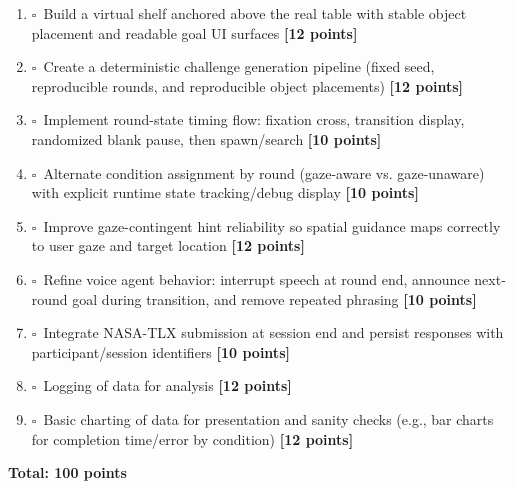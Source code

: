 \documentclass[12pt,letterpaper]{article}
\newcommand{\taskbox}{$\square$}
\begin{document}
\begin{enumerate}[leftmargin=0.8cm, itemsep=0.45cm, label=\textbf{\arabic*.}]
    \item \taskbox\ Build a virtual shelf anchored above the real table with stable object placement and readable goal UI surfaces \hfill {\color{successgreen}\bfseries [12 points]}

    \item \taskbox\ Create a deterministic challenge generation pipeline (fixed seed, reproducible rounds, and reproducible object placements) \hfill {\color{successgreen}\bfseries [12 points]}

    \item \taskbox\ Implement round-state timing flow: fixation cross, transition display, randomized blank pause, then spawn/search \hfill {\color{successgreen}\bfseries [10 points]}

    \item \taskbox\ Alternate condition assignment by round (gaze-aware vs. gaze-unaware) with explicit runtime state tracking/debug display \hfill {\color{successgreen}\bfseries [10 points]}

    \item \taskbox\ Improve gaze-contingent hint reliability so spatial guidance maps correctly to user gaze and target location \hfill {\color{successgreen}\bfseries [12 points]}

    \item \taskbox\ Refine voice agent behavior: interrupt speech at round end, announce next-round goal during transition, and remove repeated phrasing \hfill {\color{successgreen}\bfseries [10 points]}

    \item \taskbox\ Integrate NASA-TLX submission at session end and persist responses with participant/session identifiers \hfill {\color{successgreen}\bfseries [10 points]}

    \item \taskbox\ Logging of data for analysis \hfill {\color{successgreen}\bfseries [12 points]}

    \item \taskbox\ Basic charting of data for presentation and sanity checks (e.g., bar charts for completion time/error by condition) \hfill {\color{successgreen}\bfseries [12 points]}
\end{enumerate}

\vspace{0.4cm}
\textbf{Total: 100 points}
\end{document}

